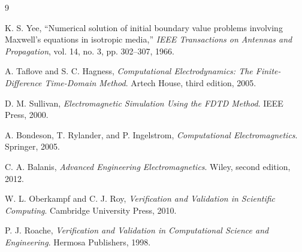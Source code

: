 \documentclass[11pt,a4paper]{article}
\begin{document}
\begin{thebibliography}{9}

K. S. Yee,
``Numerical solution of initial boundary value problems involving Maxwell's equations in isotropic media,''
\emph{IEEE Transactions on Antennas and Propagation}, vol. 14, no. 3, pp. 302--307, 1966.

A. Taflove and S. C. Hagness,
\emph{Computational Electrodynamics: The Finite-Difference Time-Domain Method}.
Artech House, third edition, 2005.

D. M. Sullivan,
\emph{Electromagnetic Simulation Using the FDTD Method}.
IEEE Press, 2000.

A. Bondeson, T. Rylander, and P. Ingelstrom,
\emph{Computational Electromagnetics}.
Springer, 2005.

C. A. Balanis,
\emph{Advanced Engineering Electromagnetics}.
Wiley, second edition, 2012.

W. L. Oberkampf and C. J. Roy,
\emph{Verification and Validation in Scientific Computing}.
Cambridge University Press, 2010.

P. J. Roache,
\emph{Verification and Validation in Computational Science and Engineering}.
Hermosa Publishers, 1998.

\end{thebibliography}
\end{document}
